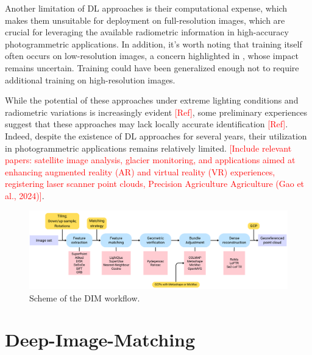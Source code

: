 Another limitation of DL approaches is their computational expense, which makes them unsuitable for deployment on full-resolution images, which are crucial for leveraging the available radiometric information in high-accuracy photogrammetric applications.
In addition, it's worth noting that training itself often occurs on low-resolution images, a concern highlighted in \cite{Wu2024_evaluation_dlstereo}, whose impact remains uncertain.
Training could have been generalized enough not to require additional training on high-resolution images. 

While the potential of these approaches under extreme lighting conditions and radiometric variations is increasingly evident \textcolor{red}{[Ref]}, some preliminary experiences suggest that these approaches may lack locally accurate identification \textcolor{red}{[Ref]}. 
Indeed, despite the existence of DL approaches for several years, their utilization in photogrammetric applications remains relatively limited. 
\textcolor{red}{[Include relevant papers: satellite image analysis, glacier monitoring, and applications aimed at enhancing augmented reality (AR) and virtual reality (VR) experiences, registering laser scanner point clouds, Precision Agriculture Agriculture (Gao et al., 2024)]}.

\begin{figure}[ht]
    \centering
    \includegraphics[width=1\textwidth]{dim_workflow_simple}
    \caption{Scheme of the DIM workflow.}
    \label{fig:5:dim_workflow}
\end{figure}

\section{Deep-Image-Matching}


